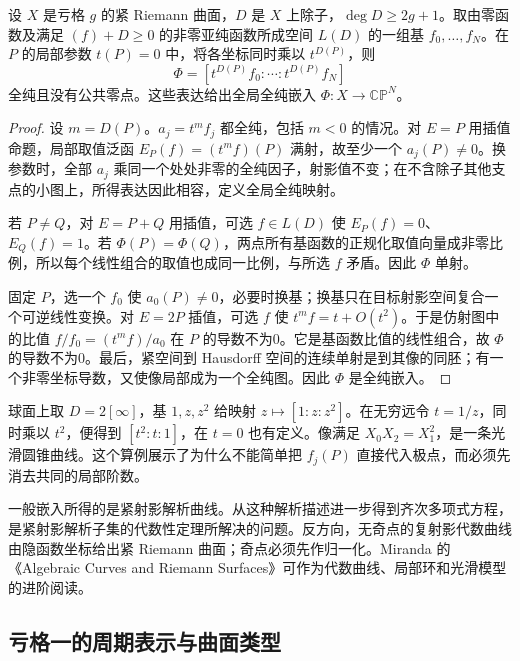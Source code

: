 \begin{proposition}[由除子构造射影嵌入]\label{b3:prop:A-projective-embedding}
设 \(X\) 是亏格 \(g\) 的紧 Riemann 曲面，\(D\) 是 \(X\) 上除子，\(\deg D\ge2g+1\)。取由零函数及满足 \((f)+D\ge0\) 的非零亚纯函数所成空间 \(L(D)\) 的一组基 \(f_0,\ldots,f_N\)。在 \(P\) 的局部参数 \(t(P)=0\) 中，将各坐标同时乘以 \(t^{D(P)}\)，则
\[
 \Phi=[t^{D(P)}f_0:\cdots:t^{D(P)}f_N]
\]
全纯且没有公共零点。这些表达给出全局全纯嵌入 \(\Phi:X\rightarrow\mathbb{CP}^N\)。
\end{proposition}
\begin{proof}
设 \(m=D(P)\)。\(a_j=t^m f_j\) 都全纯，包括 \(m<0\) 的情况。对 \(E=P\) 用插值命题，局部取值泛函 \(E_P(f)=(t^m f)(P)\) 满射，故至少一个 \(a_j(P)\ne0\)。换参数时，全部 \(a_j\) 乘同一个处处非零的全纯因子，射影值不变；在不含除子其他支点的小图上，所得表达因此相容，定义全局全纯映射。

若 \(P\ne Q\)，对 \(E=P+Q\) 用插值，可选 \(f\in L(D)\) 使 \(E_P(f)=0\)、\(E_Q(f)=1\)。若 \(\Phi(P)=\Phi(Q)\)，两点所有基函数的正规化取值向量成非零比例，所以每个线性组合的取值也成同一比例，与所选 \(f\) 矛盾。因此 \(\Phi\) 单射。

固定 \(P\)，选一个 \(f_0\) 使 \(a_0(P)\ne0\)，必要时换基；换基只在目标射影空间复合一个可逆线性变换。对 \(E=2P\) 插值，可选 \(f\) 使 \(t^m f=t+O(t^2)\)。于是仿射图中的比值 \(f/f_0=(t^m f)/a_0\) 在 \(P\) 的导数不为0。它是基函数比值的线性组合，故 \(\Phi\) 的导数不为0。最后，紧空间到 Hausdorff 空间的连续单射是到其像的同胚；有一个非零坐标导数，又使像局部成为一个全纯图。因此 \(\Phi\) 是全纯嵌入。
\end{proof}

球面上取 \(D=2[\infty]\)，基 \(1,z,z^2\) 给映射 \(z\mapsto[1:z:z^2]\)。在无穷远令 \(t=1/z\)，同时乘以 \(t^2\)，便得到 \([t^2:t:1]\)，在 \(t=0\) 也有定义。像满足 \(X_0X_2=X_1^2\)，是一条光滑圆锥曲线。这个算例展示了为什么不能简单把 \(f_j(P)\) 直接代入极点，而必须先消去共同的局部阶数。

\ProseParagraphBreak
一般嵌入所得的是紧射影解析曲线。从这种解析描述进一步得到齐次多项式方程，是紧射影解析子集的代数性定理所解决的问题。反方向，无奇点的复射影代数曲线由隐函数坐标给出紧 Riemann 曲面；奇点必须先作归一化。Miranda 的《Algebraic Curves and Riemann Surfaces》\cite{Miranda1995Algebraic}可作为代数曲线、局部环和光滑模型的进阶阅读。

\subsection{亏格一的周期表示与曲面类型}
\label{b3:subsec:A0604}

